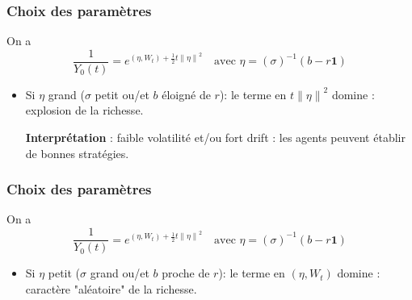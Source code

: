 \documentclass{beamer}
\begin{document}
\begin{frame}
\frametitle{Choix des paramètres}
\par On a 
\begin{displaymath}
\frac{1}{Y_0 \left( t \right)} = e^{ \left( \eta, W_{t} \right) + \frac{1}{2} t {\| \eta \|}^{2}} \quad \text{avec } \eta = (\sigma)^{-1} (b - r \textbf{1})
\end{displaymath}
\begin{itemize}
\item Si $\eta$ grand ($\sigma$ petit ou/et $b$ éloigné de $r$): le terme en $t {\| \eta \|}^{2}$ domine : explosion de la richesse.
\par \textbf{Interprétation} : faible volatilité et/ou fort drift : les agents peuvent établir de bonnes stratégies.
\end{itemize}
\end{frame}

\begin{frame}
\frametitle{Choix des paramètres}
\par On a 
\begin{displaymath}
\frac{1}{Y_0 \left( t \right)} = e^{ \left( \eta, W_{t} \right) + \frac{1}{2} t {\| \eta \|}^{2}} \quad \text{avec } \eta = (\sigma)^{-1} (b - r \textbf{1})
\end{displaymath}
\begin{itemize}
\item Si $\eta$ petit ($\sigma$ grand ou/et $b$ proche de $r$): le terme en $\left( \eta, W_{t} \right)$ domine : caractère "aléatoire" de la richesse.
\end{itemize}
\end{frame}
\end{document}
